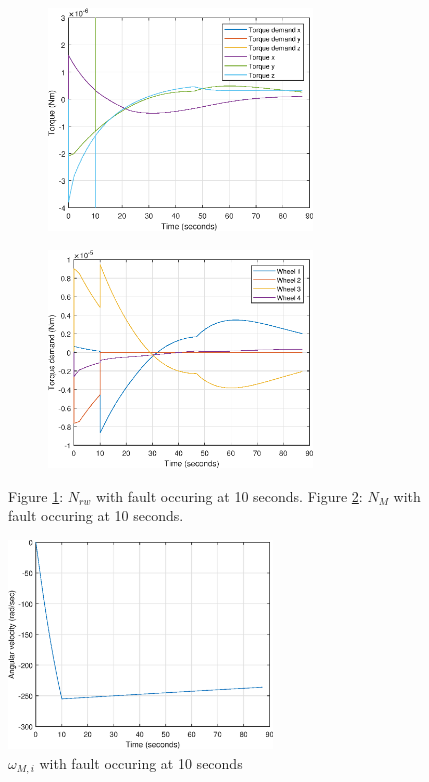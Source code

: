 \begin{figure}[H]
	\centering
	\begin{subfigure}{.5\textwidth}
	\centering
\includegraphics[width=70mm]{figures/smooth3dtorque}
\caption{}
	\label{fig:resreconfig_nrw}
	\end{subfigure}%
	\begin{subfigure}{.5\textwidth}
	\centering
\includegraphics[width=70mm]{figures/smooth_motor_torque}
\caption{}
\label{fig:resreconfig_nm}
	\end{subfigure}
	\caption{Figure \ref{fig:resreconfig_nrw}: $N_{rw}$ with fault occuring at 10 seconds. Figure \ref{fig:resreconfig_nm}: $N_M$ with fault occuring at 10 seconds.}
	\label{fig:resreconfig}
\end{figure}

%

\begin{figure} [H]
\centering
\includegraphics[width=70mm]{figures/smooth_omega_residual}
\caption{$\omega_{M,i}$ with fault occuring at 10 seconds}
\label{fig:resreconfig_ome}
\end{figure} 